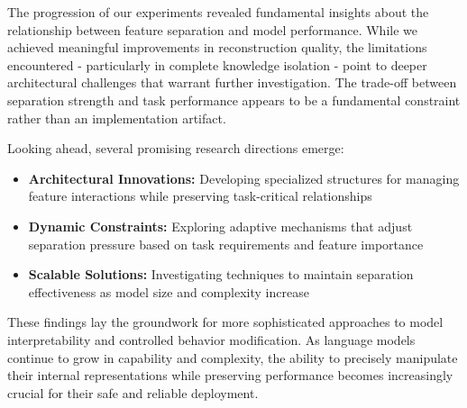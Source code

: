 \documentclass{article} %
\begin{document}
The progression of our experiments revealed fundamental insights about the relationship between feature separation and model performance. While we achieved meaningful improvements in reconstruction quality, the limitations encountered - particularly in complete knowledge isolation - point to deeper architectural challenges that warrant further investigation. The trade-off between separation strength and task performance appears to be a fundamental constraint rather than an implementation artifact.

Looking ahead, several promising research directions emerge:

\begin{itemize}
    \item \textbf{Architectural Innovations:} Developing specialized structures for managing feature interactions while preserving task-critical relationships
    \item \textbf{Dynamic Constraints:} Exploring adaptive mechanisms that adjust separation pressure based on task requirements and feature importance
    \item \textbf{Scalable Solutions:} Investigating techniques to maintain separation effectiveness as model size and complexity increase
\end{itemize}

These findings lay the groundwork for more sophisticated approaches to model interpretability and controlled behavior modification. As language models continue to grow in capability and complexity, the ability to precisely manipulate their internal representations while preserving performance becomes increasingly crucial for their safe and reliable deployment.



\end{document}
